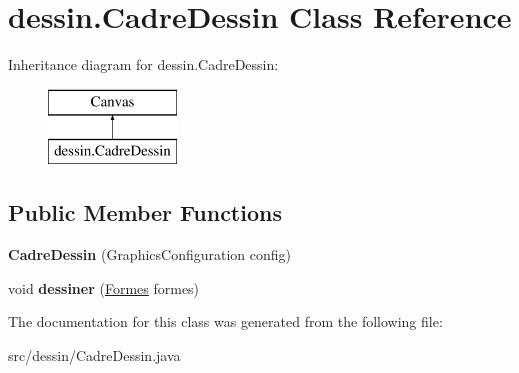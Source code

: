 \hypertarget{classdessin_1_1_cadre_dessin}{}\section{dessin.\+Cadre\+Dessin Class Reference}
\label{classdessin_1_1_cadre_dessin}
Inheritance diagram for dessin.\+Cadre\+Dessin\+:\begin{figure}[H]
\begin{center}
\leavevmode
\includegraphics[height=2.000000cm]{dd/df1/classdessin_1_1_cadre_dessin}
\end{center}
\end{figure}
\subsection*{Public Member Functions}
\begin{DoxyCompactItemize}
\item 
\mbox{\label{classdessin_1_1_cadre_dessin_a269383f046990a58447dba6e3e4f3d52}} 
{\bfseries Cadre\+Dessin} (Graphics\+Configuration config)
\item 
\mbox{\label{classdessin_1_1_cadre_dessin_ad6caf507960cc61be665dede16513af0}} 
void {\bfseries dessiner} (\mbox{\hyperlink{classdessin_1_1_formes}{Formes}} formes)
\end{DoxyCompactItemize}


The documentation for this class was generated from the following file\+:\begin{DoxyCompactItemize}
\item 
src/dessin/Cadre\+Dessin.\+java\end{DoxyCompactItemize}
